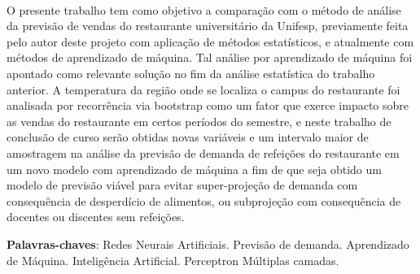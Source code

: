 \documentclass[	12pt, Times, openright, twoside, a4paper, english, brazil]{abntex2}
\begin{document}
\begin{resumo}
\paragraph*{} O presente trabalho tem como objetivo a comparação com o método de análise da previsão de vendas do restaurante universitário da Unifesp, previamente feita pelo autor deste projeto com aplicação de métodos estatísticos, e atualmente com métodos de aprendizado de máquina. Tal análise por aprendizado de máquina foi apontado como relevante solução no fim da análise estatística do trabalho anterior. A temperatura da região onde se localiza o campus do restaurante foi analisada por recorrência via bootstrap como um fator que exerce impacto sobre as vendas do restaurante em certos períodos do semestre, e neste trabalho de conclusão de curso serão obtidas novas variáveis e um intervalo maior de amostragem na análise da previsão de demanda de refeições do restaurante em um novo modelo com aprendizado de máquina a fim de que seja obtido um modelo de previsão viável para evitar super-projeção de demanda com consequência de desperdício de alimentos, ou subprojeção com consequência de docentes ou discentes sem refeições.
 
 \vspace{\onelineskip}
    
 \noindent
 \textbf{Palavras-chaves}: Redes Neurais Artificiais. Previsão de demanda. Aprendizado de Máquina. Inteligência Artificial. Perceptron Múltiplas camadas. 
 
\end{resumo}
\end{document}
